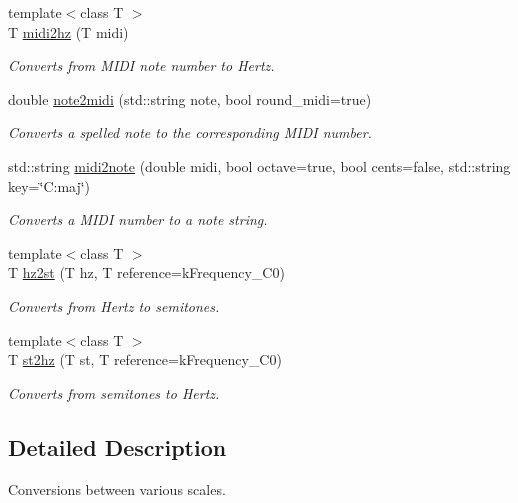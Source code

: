 \begin{DoxyCompactItemize}
{\footnotesize template$<$class T $>$ }\\T \mbox{\hyperlink{namespacedsp_1_1convert_a0750088a2969488bd248817da35129eb}{midi2hz}} (T midi)
\begin{DoxyCompactList}\small\item\em Converts from M\+I\+DI note number to Hertz. \end{DoxyCompactList}\item 
double \mbox{\hyperlink{namespacedsp_1_1convert_a05089a83b452d249f2a41c6b83070da6}{note2midi}} (std\+::string note, bool round\+\_\+midi=true)
\begin{DoxyCompactList}\small\item\em Converts a spelled note to the corresponding M\+I\+DI number. \end{DoxyCompactList}\item 
std\+::string \mbox{\hyperlink{namespacedsp_1_1convert_a593b176de512466768766cfa99ef7f6e}{midi2note}} (double midi, bool octave=true, bool cents=false, std\+::string key=\char`\"{}C\+:maj\char`\"{})
\begin{DoxyCompactList}\small\item\em Converts a M\+I\+DI number to a note string. \end{DoxyCompactList}\item 
{\footnotesize template$<$class T $>$ }\\T \mbox{\hyperlink{namespacedsp_1_1convert_afe8c6f4bf884c693174872e42be3299e}{hz2st}} (T hz, T reference=k\+Frequency\+\_\+\+C0)
\begin{DoxyCompactList}\small\item\em Converts from Hertz to semitones. \end{DoxyCompactList}\item 
{\footnotesize template$<$class T $>$ }\\T \mbox{\hyperlink{namespacedsp_1_1convert_accb7dd27b34d039ecede139455938e71}{st2hz}} (T st, T reference=k\+Frequency\+\_\+\+C0)
\begin{DoxyCompactList}\small\item\em Converts from semitones to Hertz. \end{DoxyCompactList}\end{DoxyCompactItemize}


\subsection{Detailed Description}
Conversions between various scales. 

